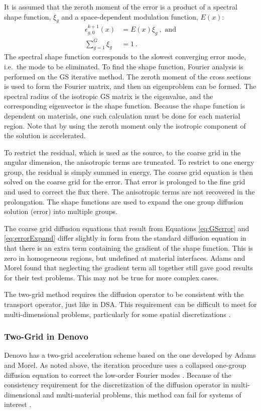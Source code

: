 It is assumed that the zeroth moment of the error is a product of a spectral shape function, $\xi_g$ and a space-dependent modulation function, $E(x)$:
%
\begin{align}
  \epsilon_{g,0}^{k+1}(x) &= E(x)\xi_{g} \:, \text{ and} \label{eq:errorExpand} \\
  \sum_{g=1}^{G} \xi_{g} &= 1 \:.
\end{align} 
%
The spectral shape function corresponds to the slowest converging error mode, i.e.\ the mode to be eliminated. To find the shape function, Fourier analysis is performed on the GS iterative method. The zeroth moment of the cross sections is used to form the Fourier matrix, and then an eigenproblem can be formed. The spectral radius of the isotropic GS matrix is the eigenvalue, and the corresponding eigenvector is the shape function. Because the shape function is dependent on materials, one such calculation must be done for each material region. Note that by using the zeroth moment only the isotropic component of the solution is accelerated.

To restrict the residual, which is used as the source, to the coarse grid in the angular dimension, the anisotropic terms are truncated. To restrict to one energy group, the residual is simply summed in energy. The coarse grid equation is then solved on the coarse grid for the error. That error is prolonged to the fine grid and used to correct the flux there. The anisotropic terms are not recovered in the prolongation. The shape functions are used to expand the one group diffusion solution (error) into multiple groups. 

The coarse grid diffusion equations that result from Equations \eqref{eq:GSerror} and \eqref{eq:errorExpand} differ slightly in form from the standard diffusion equation in that there is an extra term containing the gradient of the shape function. This is zero in homogeneous regions, but undefined at material interfaces. Adams and Morel found that neglecting the gradient term all together still gave good results for their test problems. This may not be true for more complex cases.

The two-grid method requires the diffusion operator to be consistent with the transport operator, just like in DSA. This requirement can be difficult to meet for multi-dimensional problems, particularly for some spatial discretizations \cite{Adams1993}. 

\subsubsection{Two-Grid in Denovo}
\label{sec:TTG}
Denovo has a two-grid acceleration scheme based on the one developed by Adams and Morel. As noted above, the iteration procedure uses a collapsed one-group diffusion equation to correct the low-order Fourier modes \cite{Adams1993}. Because of the consistency requirement for the discretization of the diffusion operator in multi-dimensional and multi-material problems, this method can fail for systems of interest \cite{Evans2009d}. 

